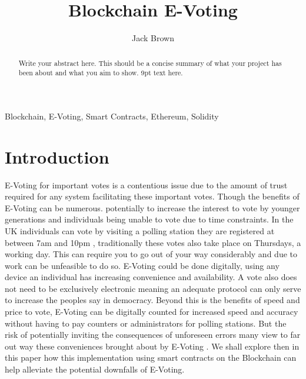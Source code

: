 \documentclass{entcs}
\begin{document}
\begin{frontmatter}

\title{Blockchain E-Voting}
\author{Jack Brown}
\address{School of Computing Science, Newcastle University, UK} 

\begin{abstract} 
Write your abstract here. This should be a concise summary of what your project has been about and what you aim to show. 9pt text here.
\end{abstract}

\begin{keyword}
Blockchain, E-Voting, Smart Contracts, Ethereum, Solidity
\end{keyword}

\end{frontmatter}

\section{Introduction}
E-Voting for important votes is a contentious issue due to the amount of trust required for any system facilitating these important votes. Though the benefits of E-Voting can be numerous. potentially to increase the interest to vote by younger generations and individuals being unable to vote due to time constraints. In the UK individuals can vote by visiting a polling station they are registered at between 7am and 10pm \cite{pollStations}, traditionally these votes also take place on Thursdays, a working day. This can require you to go out of your way considerably and due to work can be unfeasible to do so. E-Voting could be done digitally, using any device an individual has increasing convenience and availability. A vote also does not need to be exclusively electronic meaning an adequate protocol can only serve to increase the peoples say in democracy. Beyond this is the benefits of speed and price to vote, E-Voting can be digitally counted for increased speed and accuracy without having to pay counters or administrators for polling stations. But the risk of potentially inviting the consequences of unforeseen errors many view to far out way these conveniences brought about by E-Voting \cite{lauer2004risk}. We shall explore then in this paper how this implementation using smart contracts on the Blockchain can help alleviate the potential downfalls of E-Voting.
\end{document}
